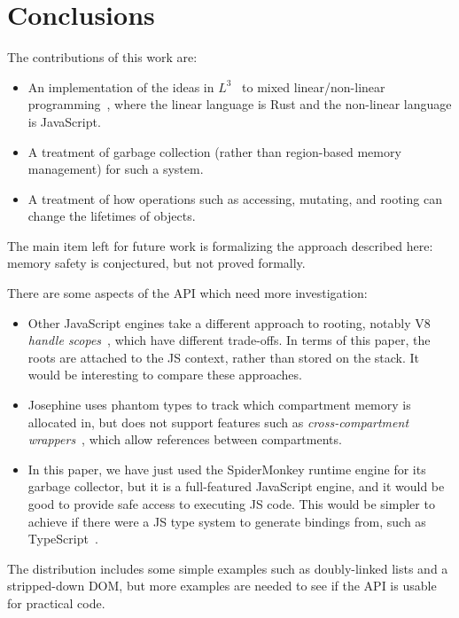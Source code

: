 \section{Conclusions}

The contributions of this work are:
\begin{itemize}

\item An implementation of the ideas in $L^3$~\cite{l3} to mixed
  linear/non-linear programming~\cite{mixed}, where the
  linear language is Rust and the non-linear language is
  JavaScript.

\item A treatment of garbage collection (rather than region-based
  memory management) for such a system.

\item A treatment of how operations such as accessing, mutating, and
  rooting can change the lifetimes of objects.
  
\end{itemize}
The main item left for future work is formalizing the approach
described here: memory safety is conjectured, but not proved
formally.

There are some aspects of the API which need more investigation:
\begin{itemize}

\item Other JavaScript engines take a different approach to
  rooting, notably V8 \emph{handle scopes}~\cite{v8-embedding},
  which have different trade-offs. In terms of this paper, the
  roots are attached to the JS context, rather than stored
  on the stack. It would be interesting to compare these approaches.

\item Josephine uses phantom types to track which compartment
  memory is allocated in, but does not support features such
  as \emph{cross-compartment wrappers}~\cite{compartments},
  which allow references between compartments.

\item In this paper, we have just used the SpiderMonkey runtime
  engine for its garbage collector, but it is a full-featured
  JavaScript engine, and it would be good to provide safe
  access to executing JS code. This would be simpler to achieve
  if there were a JS type system to generate bindings from,
  such as TypeScript~\cite{typescript}.
  
\end{itemize}
The distribution includes some simple examples such as doubly-linked lists
and a stripped-down DOM, but more examples are needed to see if the API
is usable for practical code.
